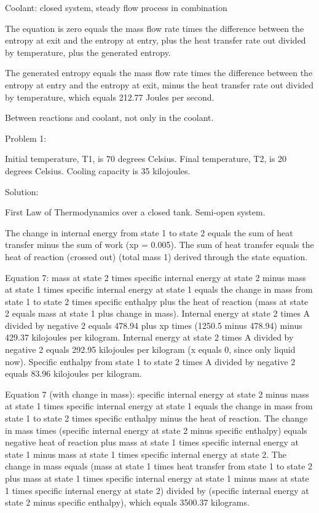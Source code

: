 Coolant: closed system, steady flow process in combination

The equation is zero equals the mass flow rate times the difference between the entropy at exit and the entropy at entry, plus the heat transfer rate out divided by temperature, plus the generated entropy.

The generated entropy equals the mass flow rate times the difference between the entropy at entry and the entropy at exit, minus the heat transfer rate out divided by temperature, which equals 212.77 Joules per second.

Between reactions and coolant, not only in the coolant.

Problem 1:

Initial temperature, T1, is 70 degrees Celsius.
Final temperature, T2, is 20 degrees Celsius.
Cooling capacity is 35 kilojoules.

Solution:

First Law of Thermodynamics over a closed tank. Semi-open system.

The change in internal energy from state 1 to state 2 equals the sum of heat transfer minus the sum of work (xp = 0.005).
The sum of heat transfer equals the heat of reaction (crossed out) (total mass 1) derived through the state equation.

Equation 7: mass at state 2 times specific internal energy at state 2 minus mass at state 1 times specific internal energy at state 1 equals the change in mass from state 1 to state 2 times specific enthalpy plus the heat of reaction (mass at state 2 equals mass at state 1 plus change in mass).
Internal energy at state 2 times A divided by negative 2 equals 478.94 plus xp times (1250.5 minus 478.94) minus 429.37 kilojoules per kilogram.
Internal energy at state 2 times A divided by negative 2 equals 292.95 kilojoules per kilogram (x equals 0, since only liquid now).
Specific enthalpy from state 1 to state 2 times A divided by negative 2 equals 83.96 kilojoules per kilogram.

Equation 7 (with change in mass): specific internal energy at state 2 minus mass at state 1 times specific internal energy at state 1 equals the change in mass from state 1 to state 2 times specific enthalpy minus the heat of reaction.
The change in mass times (specific internal energy at state 2 minus specific enthalpy) equals negative heat of reaction plus mass at state 1 times specific internal energy at state 1 minus mass at state 1 times specific internal energy at state 2.
The change in mass equals (mass at state 1 times heat transfer from state 1 to state 2 plus mass at state 1 times specific internal energy at state 1 minus mass at state 1 times specific internal energy at state 2) divided by (specific internal energy at state 2 minus specific enthalpy), which equals 3500.37 kilograms.